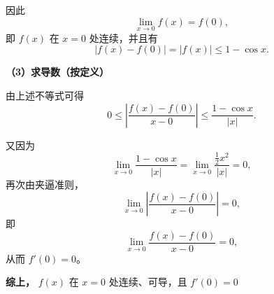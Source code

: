 \documentclass[a4paper,12pt]{article}
\begin{document}
\begin{enumerate}
\begin{analysisbox}[经典]
            因此
            \[
                \lim_{x\to 0}f(x) = f(0),
            \]
            即 $f(x)$ 在 $x=0$ 处连续，并且有
            \[
                |f(x)-f(0)| = |f(x)| \le 1-\cos x.
            \]

            \medskip
            \textcolor{analysisTitleColor}{\textbf{（3）求导数（按定义）}}

            由上述不等式可得
            \[
                0 \le
                \left|
                \frac{f(x)-f(0)}{x-0}
                \right|
                \le
                \frac{1-\cos x}{|x|}.
            \]

            又因为
            \[
                \lim_{x\to 0}\frac{1-\cos x}{|x|}
                =
                \lim_{x\to 0}\frac{\frac{1}{2}x^2}{|x|}
                =0,
            \]
            再次由夹逼准则，
            \[
                \lim_{x\to 0}
                \left|
                \frac{f(x)-f(0)}{x-0}
                \right|
                =0,
            \]
            即
            \[
                \lim_{x\to 0}
                \frac{f(x)-f(0)}{x-0}
                =0,
            \]
            从而 $f'(0)=0$。

            \medskip
            \textbf{综上，}
            $f(x)$ 在 $x=0$ 处连续、可导，且 $f'(0)=0$

        \end{analysisbox}

    \end{enumerate}
\end{document}
